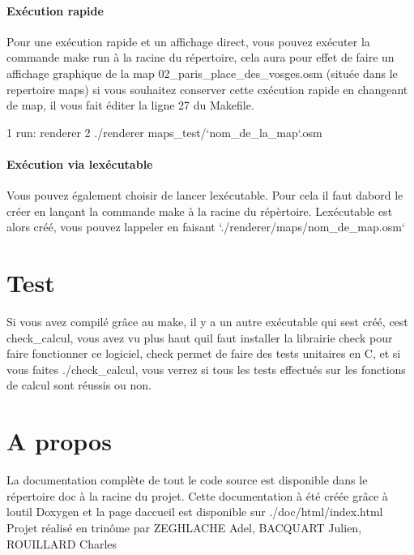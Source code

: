 \paragraph*{Exécution rapide}

Pour une exécution rapide et un affichage direct, vous pouvez exécuter la commande {\ttfamily make run} à la racine du répertoire, cela aura pour effet de faire un affichage graphique de la map \textquotesingle{}02\+\_\+paris\+\_\+place\+\_\+des\+\_\+vosges.\+osm\textquotesingle{} (située dans le repertoire maps) si vous souhaitez conserver cette exécution rapide en changeant de map, il vous fait éditer la ligne 27 du Makefile. 
\begin{DoxyCode}
1 run: renderer
2         ./renderer maps\_test/`nom\_de\_la\_map`.osm 
\end{DoxyCode}
 \paragraph*{Exécution via l\textquotesingle{}exécutable}

Vous pouvez également choisir de lancer l\textquotesingle{}exécutable. Pour cela il faut d\textquotesingle{}abord le créer en lançant la commande {\ttfamily make} à la racine du répèrtoire. L\textquotesingle{}exécutable est alors créé, vous pouvez l\textquotesingle{}appeler en faisant `./renderer/maps/\textquotesingle{}nom\+\_\+de\+\_\+map\textquotesingle{}.osm` \section*{Test}

Si vous avez compilé grâce au {\ttfamily make}, il y a un autre exécutable qui s\textquotesingle{}est créé, c\textquotesingle{}est {\ttfamily check\+\_\+calcul}, vous avez vu plus haut qu\textquotesingle{}il faut installer la librairie check pour faire fonctionner ce logiciel, check permet de faire des tests unitaires en C, et si vous faites {\ttfamily ./check\+\_\+calcul}, vous verrez si tous les tests effectués sur les fonctions de calcul sont réussis ou non.

\section*{A propos}

La documentation complète de tout le code source est disponible dans le répertoire doc à la racine du projet. Cette documentation à été créée grâce à l\textquotesingle{}outil Doxygen et la page d\textquotesingle{}accueil est disponible sur {\ttfamily ./doc/html/index.html} Projet réalisé en trinôme par Z\+E\+G\+H\+L\+A\+C\+HE Adel, B\+A\+C\+Q\+U\+A\+RT Julien, R\+O\+U\+I\+L\+L\+A\+RD Charles 